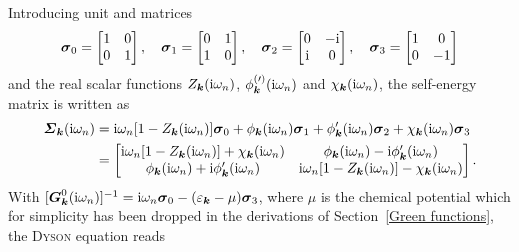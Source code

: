 Introducing unit and  matrices
%
\begin{equation*}
    \boldsymbol \sigma_0 =
    \begin{bmatrix}
        1 & 0 \\
        0 & 1
    \end{bmatrix},
    \quad
    \boldsymbol \sigma_1 =
    \begin{bmatrix}
        0 & 1 \\
        1 & 0
    \end{bmatrix},
    \quad
    \boldsymbol \sigma_2 =
    \begin{bmatrix}
        0 & -\mathrm i \\
        \mathrm i & 0
    \end{bmatrix},
    \quad
    \boldsymbol \sigma_3 =
    \begin{bmatrix}
    1 & 0 \\
    0 & -1
    \end{bmatrix}
\end{equation*}
%
and the real scalar functions $Z_{\boldsymbol k}(\mathrm i \omega_n)$, $\phi^{(\prime)}_{\boldsymbol
k}(\mathrm i \omega_n)$ and $\chi_{\boldsymbol k}(\mathrm i \omega_n)$, the self-energy matrix is
written as
%
\begin{align} \label{self-energy matrix}
    \boldsymbol {\varSigma}_{\boldsymbol k}(\mathrm i \omega_n) &= \mathrm i \omega_n
    [1 - Z_{\boldsymbol k}(\mathrm i \omega_n)] \boldsymbol \sigma_0
    + \phi _{\boldsymbol k}(\mathrm i \omega_n) \boldsymbol \sigma_1
    + \phi'_{\boldsymbol k}(\mathrm i \omega_n) \boldsymbol \sigma_2
    + \chi _{\boldsymbol k}(\mathrm i \omega_n) \boldsymbol \sigma_3
    \\ \notag
    &=
    \begin{bmatrix}
        \mathrm i \omega_n [1 - Z_{\boldsymbol k}(\mathrm i \omega_n)] + \chi_{\boldsymbol k}(\mathrm i \omega_n) &
        \phi_{\boldsymbol k}(\mathrm i \omega_n) - \mathrm i \phi'_{\boldsymbol k}(\mathrm i \omega_n) \\
        \phi_{\boldsymbol k}(\mathrm i \omega_n) + \mathrm i \phi'_{\boldsymbol k}(\mathrm i \omega_n) &
        \mathrm i \omega_n [1 - Z_{\boldsymbol k}(\mathrm i \omega_n)] - \chi_{\boldsymbol k}(\mathrm i \omega_n)
    \end{bmatrix}.
\end{align}
%
With $[\boldsymbol G^0_{\boldsymbol k}(\mathrm i \omega_n)]^{-1} = \mathrm i \omega_n \boldsymbol \sigma_0 -
(\varepsilon_{\boldsymbol k} - \mu) \boldsymbol \sigma_3$, where $\mu$ is the chemical potential
which for simplicity has been dropped in the derivations of Section~\ref{Green
functions}, the \textsc{Dyson} equation reads
%
